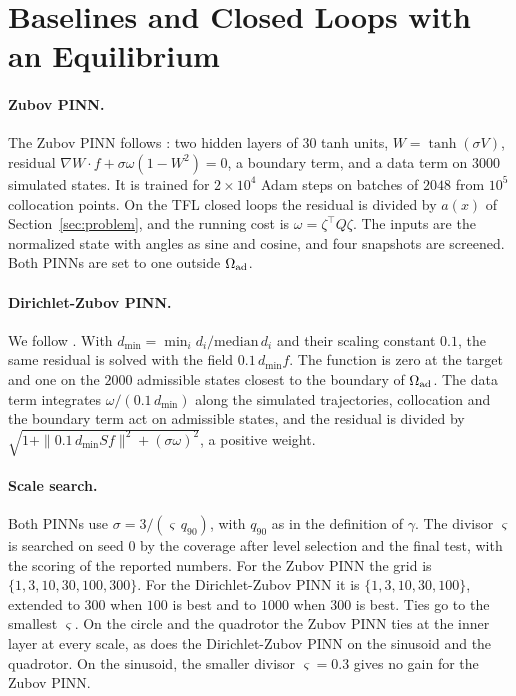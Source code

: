 \section{Baselines and Closed Loops with an Equilibrium}\label{app:bench}
\paragraph{Zubov PINN.} The Zubov PINN follows \citet{liu2025}: two hidden layers of 30 tanh units, $W=\tanh(\sigma V)$, residual $\nabla W\cdot f+\sigma\omega(1-W^2)=0$, a boundary term, and a data term on $3000$ simulated states. It is trained for $2\times10^4$ Adam steps on batches of $2048$ from $10^5$ collocation points. On the TFL closed loops the residual is divided by $a(x)$ of Section~\ref{sec:problem}, and the running cost is $\omega=\zeta^\top Q\zeta$. The inputs are the normalized state with angles as sine and cosine, and four snapshots are screened. Both PINNs are set to one outside $\Omega_{\mathrm{ad}}$.

\paragraph{Dirichlet-Zubov PINN.} We follow \citet{mengliu2026}. With $d_{\min}=\min_id_i/\mathrm{median}\,d_i$ and their scaling constant $0.1$, the same residual is solved with the field $0.1\,d_{\min}f$. The function is zero at the target and one on the $2000$ admissible states closest to the boundary of $\Omega_{\mathrm{ad}}$. The data term integrates $\omega/(0.1\,d_{\min})$ along the simulated trajectories, collocation and the boundary term act on admissible states, and the residual is divided by $\sqrt{1+\|0.1\,d_{\min}Sf\|^2+(\sigma\omega)^2}$, a positive weight.

\paragraph{Scale search.} Both PINNs use $\sigma=3/(\varsigma\,q_{90})$, with $q_{90}$ as in the definition of $\gamma$. The divisor $\varsigma$ is searched on seed 0 by the coverage after level selection and the final test, with the scoring of the reported numbers. For the Zubov PINN the grid is $\{1,3,10,30,100,300\}$. For the Dirichlet-Zubov PINN it is $\{1,3,10,30,100\}$, extended to $300$ when $100$ is best and to $1000$ when $300$ is best. Ties go to the smallest $\varsigma$. On the circle and the quadrotor the Zubov PINN ties at the inner layer at every scale, as does the Dirichlet-Zubov PINN on the sinusoid and the quadrotor. On the sinusoid, the smaller divisor $\varsigma=0.3$ gives no gain for the Zubov PINN.

